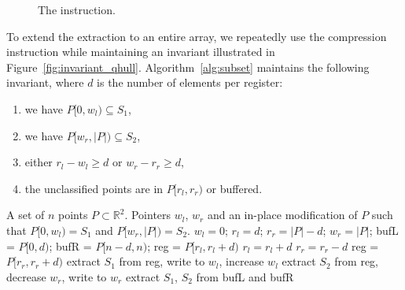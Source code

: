 \begin{figure}[ht]
  \centering
  \caption{The  instruction.}%
  \label{fig:compress}%
\end{figure}

To extend the extraction to an entire array, we repeatedly use the compression instruction while maintaining an invariant illustrated in Figure~\ref{fig:invariant_qhull}.
Algorithm~\ref{alg:subset} maintains the following invariant, where $d$ is the number of elements per register:
\begin{enumerate}
  \item we have $P[0, w_l) \subseteq S_1$,
  \item we have $P[w_r, |P|) \subseteq S_2$,
  \item either $r_l - w_l \geq d$ or $w_r - r_r \geq d$,
  \item the unclassified points are in $P[r_l, r_r)$ or buffered.
\end{enumerate}

\begin{algorithm}[ht]
  \begin{algorithmic}[1]
    \Require A set of $n$ points $P \subset \mathbb{R}^2$.
    \Ensure Pointers $w_l$, $w_r$ and an in-place modification of $P$ such
    that $P[0, w_l) = S_1$ and $P[w_r, |P|) = S_2$.
    \State $w_l = 0$; $r_l = d$; $r_r = |P| - d$; $w_r = |P|$;
    \State bufL = $P[0, d)$; bufR = $P[n - d, n)$;
        \State reg = $P[r_l, r_l + d)$
        \State $r_l = r_l + d$
      \Else
        \State $r_r = r_r - d$
        \State reg = $P[r_r, r_r + d)$
      \EndIf
      \State extract $S_1$ from reg, write to $w_l$, increase $w_l$
      \State extract $S_2$ from reg, decrease $w_r$, write to $w_r$
    \EndWhile
    \State extract $S_1$, $S_2$ from bufL and bufR
  \end{algorithmic}%
  \label{alg:subset}%
\end{algorithm}


